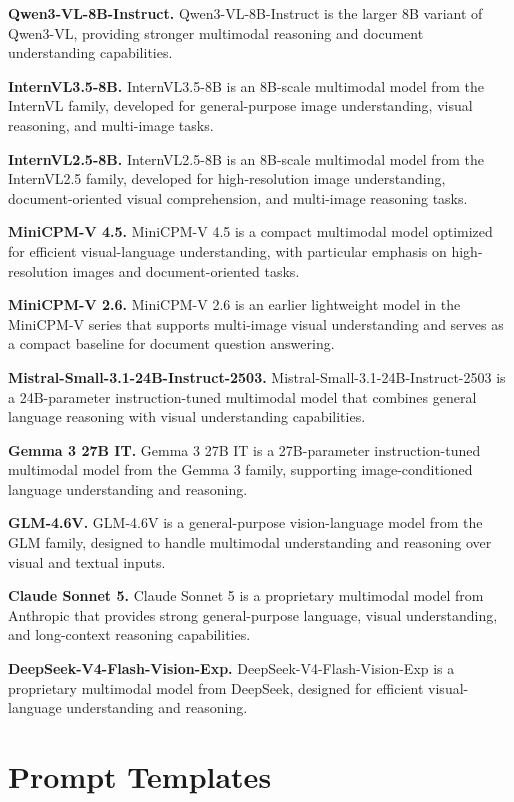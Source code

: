\documentclass{article} %
\begin{document}
\noindent\textbf{Qwen3-VL-8B-Instruct.}
Qwen3-VL-8B-Instruct is the larger 8B variant of Qwen3-VL, providing stronger multimodal reasoning and document understanding capabilities.

\noindent\textbf{InternVL3.5-8B.}
InternVL3.5-8B is an 8B-scale multimodal model from the InternVL family, developed for general-purpose image understanding, visual reasoning, and multi-image tasks.

\noindent\textbf{InternVL2.5-8B.}
InternVL2.5-8B is an 8B-scale multimodal model from the InternVL2.5 family, developed for high-resolution image understanding, document-oriented visual comprehension, and multi-image reasoning tasks.

\noindent\textbf{MiniCPM-V 4.5.}
MiniCPM-V 4.5 is a compact multimodal model optimized for efficient visual-language understanding, with particular emphasis on high-resolution images and document-oriented tasks.

\noindent\textbf{MiniCPM-V 2.6.}
MiniCPM-V 2.6 is an earlier lightweight model in the MiniCPM-V series that supports multi-image visual understanding and serves as a compact baseline for document question answering.

\noindent\textbf{Mistral-Small-3.1-24B-Instruct-2503.}
Mistral-Small-3.1-24B-Instruct-2503 is a 24B-parameter instruction-tuned multimodal model that combines general language reasoning with visual understanding capabilities.

\noindent\textbf{Gemma 3 27B IT.}
Gemma 3 27B IT is a 27B-parameter instruction-tuned multimodal model from the Gemma 3 family, supporting image-conditioned language understanding and reasoning.

\noindent\textbf{GLM-4.6V.}
GLM-4.6V is a general-purpose vision-language model from the GLM family, designed to handle multimodal understanding and reasoning over visual and textual inputs.

\noindent\textbf{Claude Sonnet 5.}
Claude Sonnet 5 is a proprietary multimodal model from Anthropic that provides strong general-purpose language, visual understanding, and long-context reasoning capabilities.

\noindent\textbf{DeepSeek-V4-Flash-Vision-Exp.}
DeepSeek-V4-Flash-Vision-Exp is a proprietary multimodal model from DeepSeek, designed for efficient visual-language understanding and reasoning.
\section{Prompt Templates}
\label{app:prompts}
\end{document}

